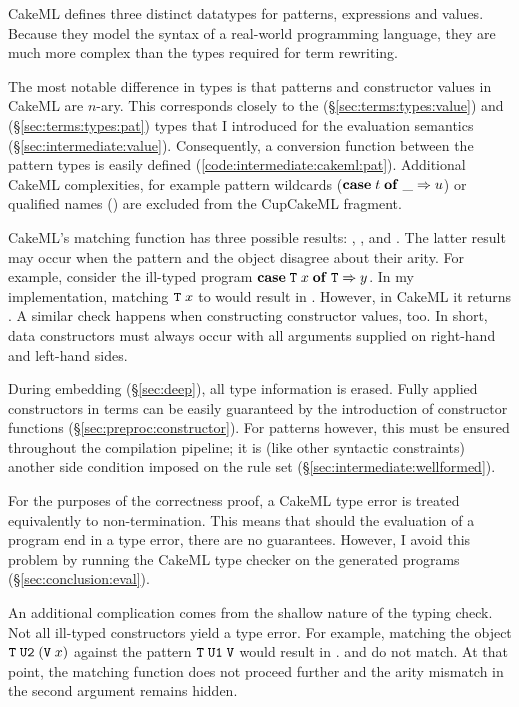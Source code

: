 CakeML defines three distinct datatypes for patterns, expressions and values.
Because they model the syntax of a real-world programming language, they are much more complex than the types required for term rewriting.

The most notable difference in types is that patterns and constructor values in CakeML are $n$-ary.
This corresponds closely to the  (§\ref{sec:terms:types:value}) and  (§\ref{sec:terms:types:pat}) types that I introduced for the evaluation semantics (§\ref{sec:intermediate:value}).
Consequently, a conversion function between the pattern types is easily defined (\cref{code:intermediate:cakeml:pat}).
Additional CakeML complexities, for example pattern wildcards ($\mathtt{\mathbf{case}}\;t\;\mathtt{\mathbf{of}}\;\_ \Rightarrow u$) or qualified names () are excluded from the CupCakeML fragment.

CakeML's matching function has three possible results: , , and .
The latter result may occur when the pattern and the object disagree about their arity.
For example, consider the ill-typed program $\mathtt{\mathbf{case}}\;\texttt{\textup{T}}\;x\;\mathtt{\mathbf{of}}\;\texttt{\textup{T}} \Rightarrow y$.
In my implementation, matching $\texttt{\textup{T}}\;x$ to  would result in .
However, in CakeML it returns .
A similar check happens when constructing constructor values, too.
In short, data constructors must always occur with all arguments supplied on right-hand and left-hand sides.

During embedding (§\ref{sec:deep}), all type information is erased.
Fully applied constructors in terms can be easily guaranteed by the introduction of constructor functions (§\ref{sec:preproc:constructor}).
For patterns however, this must be ensured throughout the compilation pipeline; it is (like other syntactic constraints) another side condition imposed on the rule set (§\ref{sec:intermediate:wellformed}).

For the purposes of the correctness proof, a CakeML type error is treated equivalently to non-termination.
This means that should the evaluation of a program end in a type error, there are no guarantees.
However, I avoid this problem by running the CakeML type checker on the generated programs (§\ref{sec:conclusion:eval}).

An additional complication comes from the shallow nature of the typing check.
Not all ill-typed constructors yield a type error.
For example, matching the object $\texttt{\textup{T}}\;\texttt{\textup{U2}}\;(\texttt{\textup{V}}\;x)$ against the pattern $\texttt{\textup{T}}\;\texttt{\textup{U1}}\;\texttt{\textup{V}}$ would result in .
 and  do not match.
At that point, the matching function does not proceed further and the arity mismatch in the second argument remains hidden.


